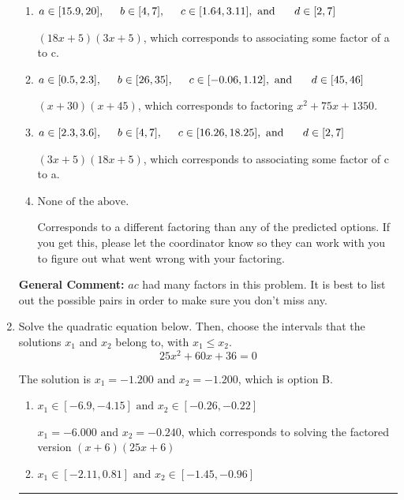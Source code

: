 \documentclass{extbook}[14pt]
\newcommand{\litem}[1]{\item #1

\rule{\textwidth}{0.4pt}}
\begin{document}
\begin{enumerate}
{\begin{enumerate}[label=\Alph*.]
* $(6x + 5)(9x + 5)$, which is the correct option.
\item \( a \in [15.9, 20], \hspace*{5mm} b \in [4, 7], \hspace*{5mm} c \in [1.64, 3.11], \text{ and } \hspace*{5mm} d \in [2, 7] \)

 $(18x + 5)(3x + 5)$, which corresponds to associating some factor of a to c.
\item \( a \in [0.5, 2.3], \hspace*{5mm} b \in [26, 35], \hspace*{5mm} c \in [-0.06, 1.12], \text{ and } \hspace*{5mm} d \in [45, 46] \)

 $(x + 30)(x + 45)$, which corresponds to factoring $x^{2} +75 x + 1350$.
\item \( a \in [2.3, 3.6], \hspace*{5mm} b \in [4, 7], \hspace*{5mm} c \in [16.26, 18.25], \text{ and } \hspace*{5mm} d \in [2, 7] \)

 $(3x + 5)(18x + 5)$, which corresponds to associating some factor of c to a.
\item \( \text{None of the above.} \)

 Corresponds to a different factoring than any of the predicted options. If you get this, please let the coordinator know so they can work with you to figure out what went wrong with your factoring.
\end{enumerate}

\textbf{General Comment:} $ac$ had many factors in this problem. It is best to list out the possible pairs in order to make sure you don't miss any.
}
\litem{
Solve the quadratic equation below. Then, choose the intervals that the solutions $x_1$ and $x_2$ belong to, with $x_1 \leq x_2$.
\[ 25x^{2} +60 x + 36 = 0 \]

The solution is \( x_1 = -1.200 \text{ and } x_2 = -1.200 \), which is option B.\begin{enumerate}[label=\Alph*.]
\item \( x_1 \in [-6.9, -4.15] \text{ and } x_2 \in [-0.26, -0.22] \)

$x_1 = -6.000 \text{ and } x_2 = -0.240$, which corresponds to solving the factored version $(x + 6)(25x + 6)$
\item \( x_1 \in [-2.11, 0.81] \text{ and } x_2 \in [-1.45, -0.96] \)


\end{enumerate}}
\end{enumerate}
\end{document}
